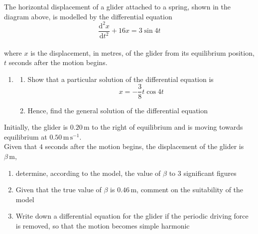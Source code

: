 \documentclass[leqno]{article}
\begin{document}
\begin{enumerate}[
  label=\textbf{\arabic*.},
  leftmargin=*,
  topsep=0pt,
  partopsep=0pt,
  parsep=0pt
]
\begin{figure}[H]
\end{figure}


The horizontal displacement of a glider attached to a spring, shown in the diagram above, is modelled by the differential equation \\
\[\frac{\mathrm{d}^2 x}{\mathrm{d} t^2}+16x=3\sin 4t\] \\
where $x$ is the displacement, in metres, of the glider from its equilibrium position, $t$ seconds after the motion begins. \\
\begin{enumerate}[label=\textbf{(\alph*)}]
  \item
  \begin{enumerate}[label=(\roman*)]
    \item Show that a particular solution of the differential equation is
    \[
    x=-\frac{3}{8} t \cos 4t
    \] 
    \item Hence, find the general solution of the differential equation  \\
  \end{enumerate}
\end{enumerate}
Initially, the glider is $0.20\,\mathrm{m}$ to the right of equilibrium and is moving towards equilibrium at $0.50\,\mathrm{m\,s^{-1}}$. \\
Given that $4$ seconds after the motion begins, the displacement of the glider is $\beta\,\mathrm{m}$, \\
\begin{enumerate}[label=\textbf{(\alph*)}, resume]
  \item determine, according to the model, the value of $\beta$ to $3$ significant figures  \\
  \item Given that the true value of $\beta$ is $0.46\,\mathrm{m}$, comment on the suitability of the model  \\
  \item Write down a differential equation for the glider if the periodic driving force is removed, so that the motion becomes simple harmonic  \\
\end{enumerate}


\end{enumerate}
\end{document}

